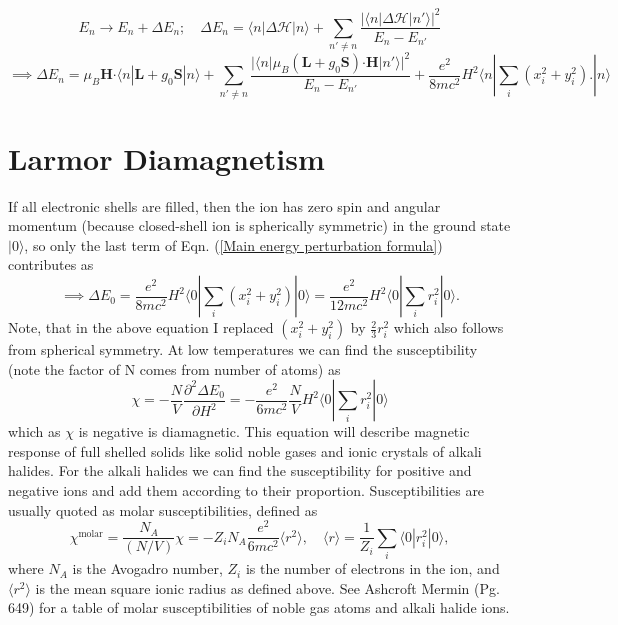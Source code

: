 \documentclass{article}
\begin{document}
\begin{equation}
E_n \to E_n + \Delta E_n; \quad \Delta E_n = \langle n | \Delta \mathcal{H} |n\rangle + \sum_{n' \neq n} \frac{| \langle n | \Delta \mathcal{H} |n' \rangle |^2}{E_n - E_{n'}}
\end{equation}
\begin{equation}\label{Main energy perturbation formula}
\implies  \Delta E_n =\mu_B \mathbf{H}\mathbf{ \cdot} \langle n | \mathbf{L}+ g_0 \mathbf{S} |n\rangle + \sum_{n' \neq n} \frac{| \langle n | \mu_B (\mathbf{L}+ g_0 \mathbf{S})\mathbf{ \cdot} \mathbf{H}|n' \rangle |^2}{E_n - E_{n'}}+ \frac{e^2}{8mc^2} H^2 \langle n |  \sum_i (x_i ^2 + y_i ^2). |n\rangle
\end{equation}

\section{Larmor Diamagnetism}
If all electronic shells are filled, then the ion has zero spin and angular momentum (because closed-shell ion is spherically symmetric) in the ground state $|0\rangle$, so only the last term of Eqn. (\ref{Main energy perturbation formula}) contributes as
\begin{equation}
\implies  \Delta E_0 = \frac{e^2}{8mc^2} H^2 \langle 0 |  \sum_i (x_i ^2 + y_i ^2) |0\rangle =  \frac{e^2}{12mc^2} H^2 \langle 0 |  \sum_i r_i ^2 |0\rangle.
\end{equation}
Note, that in the above equation I replaced $(x_i ^2 + y_i ^2)$ by $\frac{2}{3} r_i ^2 $ which also follows from spherical symmetry. At low temperatures we can find the susceptibility (note the factor of N comes from number of atoms) as
\begin{equation}
\chi =  -\frac{N}{V}\frac{\partial^2 \Delta E_0 }{\partial H^2}=   -\frac{e^2}{6mc^2} \frac{N}{V} H^2 \langle 0 |  \sum_i r_i ^2 |0\rangle
\end{equation}
which as $\chi$ is negative is diamagnetic. This equation will describe magnetic response of full shelled solids  like solid noble gases and ionic crystals of alkali halides. For the alkali halides we can find the susceptibility for positive and negative ions and add them according to their proportion. Susceptibilities are usually quoted as molar susceptibilities, defined as
\begin{equation}
\chi^{\mathrm{molar}} = \frac{N_A}{(N/V)} \chi = -Z_i N_A \frac{e^2}{6mc^2} \langle r^2 \rangle, \quad \langle r\rangle = \frac{1}{Z_i} \sum_i \langle 0 |   r_i ^2 |0\rangle,
\end{equation}
where $N_A$ is the Avogadro number, $Z_i$ is the number of electrons in the ion, and $\langle r^2 \rangle$ is the mean square ionic radius as defined above. See Ashcroft Mermin (Pg. 649) for a table of molar susceptibilities of noble gas atoms and alkali halide ions.
\end{document}
